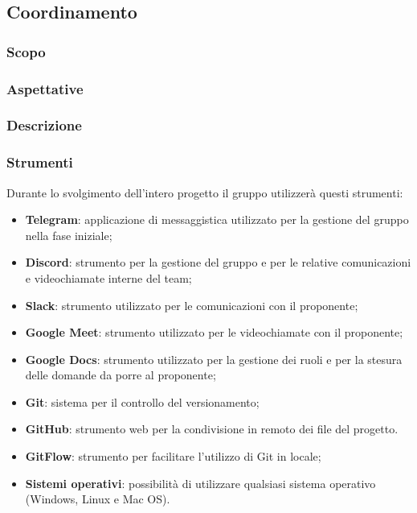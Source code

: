 \subsection{Coordinamento}

\subsubsection{Scopo}

\subsubsection{Aspettative}

\subsubsection{Descrizione}





\subsubsection{Strumenti}
Durante lo svolgimento dell'intero progetto il gruppo utilizzerà questi strumenti:
\begin{itemize}
	\item \textbf{Telegram}: applicazione di messaggistica utilizzato per la gestione del gruppo nella fase iniziale;
	\item \textbf{Discord}: strumento per la gestione del gruppo e per le relative comunicazioni e videochiamate interne del team;
	\item \textbf{Slack}: strumento utilizzato per le comunicazioni con il proponente;
	\item \textbf{Google Meet}: strumento utilizzato per le videochiamate con il proponente;
	\item \textbf{Google Docs}: strumento utilizzato per la gestione dei ruoli e per la stesura delle domande da porre al proponente;
	\item \textbf{Git}: sistema per il controllo del versionamento;
	\item \textbf{GitHub}: strumento web per la condivisione in remoto dei file del progetto.
	\item \textbf{GitFlow}: strumento per facilitare l'utilizzo di Git in locale;
	\item \textbf{Sistemi operativi}: possibilità di utilizzare qualsiasi sistema operativo (Windows, Linux e Mac OS).
\end{itemize}